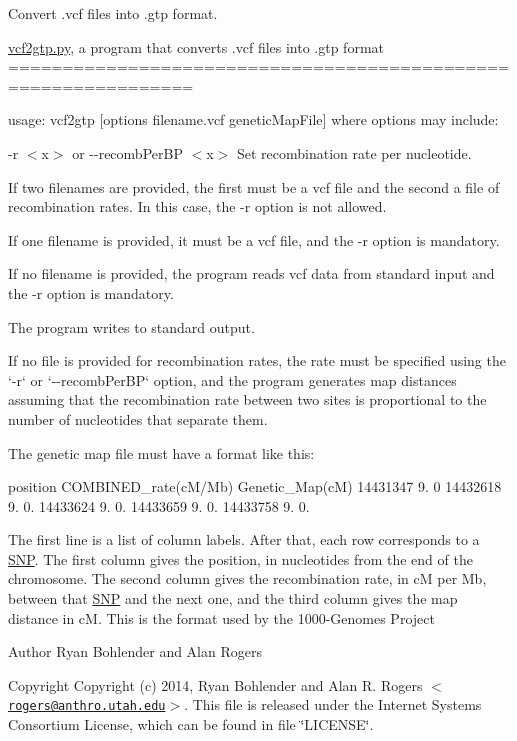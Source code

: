 \-Convert .vcf files into .gtp format.

\hyperlink{vcf2gtp_8py}{vcf2gtp.\-py}, a program that converts .vcf files into .gtp format ===============================================================

usage\-: vcf2gtp \mbox{[}options filename.\-vcf genetic\-Map\-File\mbox{]} where options may include\-:

-\/r $<$x$>$ or -\/-\/recomb\-Per\-B\-P $<$x$>$ \-Set recombination rate per nucleotide.

\-If two filenames are provided, the first must be a vcf file and the second a file of recombination rates. \-In this case, the -\/r option is not allowed.

\-If one filename is provided, it must be a vcf file, and the -\/r option is mandatory.

\-If no filename is provided, the program reads vcf data from standard input and the -\/r option is mandatory.

\-The program writes to standard output.

\-If no file is provided for recombination rates, the rate must be specified using the `-\/r` or `-\/-\/recomb\-Per\-B\-P` option, and the program generates map distances assuming that the recombination rate between two sites is proportional to the number of nucleotides that separate them.

\-The genetic map file must have a format like this\-:

position \-C\-O\-M\-B\-I\-N\-E\-D\-\_\-rate(c\-M/\-Mb) \-Genetic\-\_\-\-Map(c\-M) 14431347 9. 0 14432618 9. 0. 14433624 9. 0. 14433659 9. 0. 14433758 9. 0.

\-The first line is a list of column labels. \-After that, each row corresponds to a \hyperlink{struct_s_n_p}{\-S\-N\-P}. \-The first column gives the position, in nucleotides from the end of the chromosome. \-The second column gives the recombination rate, in c\-M per \-Mb, between that \hyperlink{struct_s_n_p}{\-S\-N\-P} and the next one, and the third column gives the map distance in c\-M. \-This is the format used by the 1000-\/\-Genomes \-Project

\begin{DoxyAuthor}{\-Author}
\-Ryan \-Bohlender and \-Alan \-Rogers 
\end{DoxyAuthor}
\begin{DoxyCopyright}{\-Copyright}
\-Copyright (c) 2014, \-Ryan \-Bohlender and \-Alan \-R. \-Rogers $<$\href{mailto:rogers@anthro.utah.edu}{\tt rogers@anthro.\-utah.\-edu}$>$. \-This file is released under the \-Internet \-Systems \-Consortium \-License, which can be found in file \char`\"{}\-L\-I\-C\-E\-N\-S\-E\char`\"{}. 
\end{DoxyCopyright}
